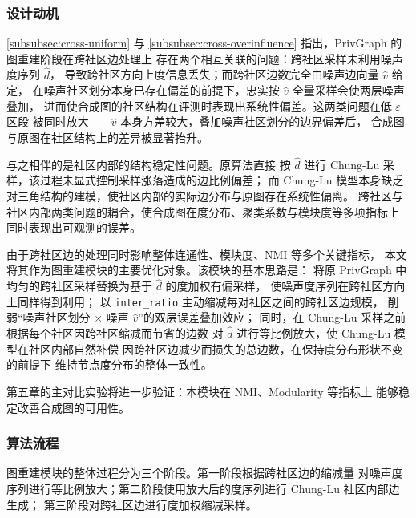 \subsubsection{设计动机}

\par \autoref{subsubsec:cross-uniform} 与 \autoref{subsubsec:cross-overinfluence} 指出，PrivGraph 的图重建阶段在跨社区边处理上
存在两个相互关联的问题：跨社区采样未利用噪声度序列 $\hat{d}$，
导致跨社区方向上度信息丢失；而跨社区边数完全由噪声边向量 $\hat{v}$ 给定，
在噪声社区划分本身已存在偏差的前提下，忠实按 $\hat{v}$ 全量采样会使两层噪声叠加，
进而使合成图的社区结构在评测时表现出系统性偏差。这两类问题在低 $\varepsilon$ 区段
被同时放大——$\hat{v}$ 本身方差较大，叠加噪声社区划分的边界偏差后，
合成图与原图在社区结构上的差异被显著抬升。

\par 与之相伴的是社区内部的结构稳定性问题。原算法直接
按 $\hat{d}$ 进行 Chung-Lu 采样，该过程未显式控制采样涨落造成的边比例偏差；
而 Chung-Lu 模型本身缺乏对三角结构的建模，使社区内部的实际边分布与原图存在系统性偏离。
跨社区与社区内部两类问题的耦合，使合成图在度分布、聚类系数与模块度等多项指标上
同时表现出可观测的误差。

\par 由于跨社区边的处理同时影响整体连通性、模块度、NMI 等多个关键指标，
本文将其作为图重建模块的主要优化对象。该模块的基本思路是：
将原 PrivGraph 中均匀的跨社区采样替换为基于 $\hat{d}$ 的度加权有偏采样，
使噪声度序列在跨社区方向上同样得到利用；
以 \texttt{inter\_ratio} 主动缩减每对社区之间的跨社区边规模，
削弱``噪声社区划分 $\times$ 噪声 $\hat{v}$''的双层误差叠加效应；
同时，在 Chung-Lu 采样之前根据每个社区因跨社区缩减而节省的边数
对 $\hat{d}$ 进行等比例放大，使 Chung-Lu 模型在社区内部自然补偿
因跨社区边减少而损失的总边数，在保持度分布形状不变的前提下
维持节点度分布的整体一致性。
\par 第五章的主对比实验将进一步验证：本模块在 NMI、Modularity 等指标上
能够稳定改善合成图的可用性。

\subsubsection{算法流程}

\par 图重建模块的整体过程分为三个阶段。第一阶段根据跨社区边的缩减量
对噪声度序列进行等比例放大；第二阶段使用放大后的度序列进行 Chung-Lu 社区内部边生成；
第三阶段对跨社区边进行度加权缩减采样。

